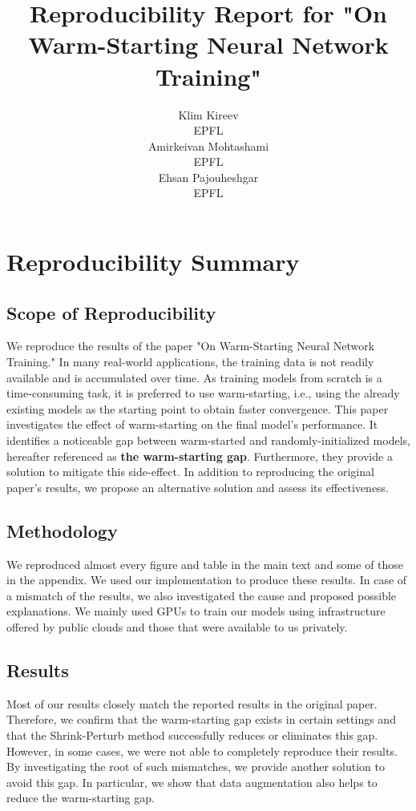 \documentclass{article}
\title{Reproducibility Report for "On Warm-Starting Neural Network Training"}
\author{%
  Klim Kireev\\
  EPFL \\
  \And
  Amirkeivan Mohtashami\\
  EPFL \\
  \And
  Ehsan Pajouheshgar \\
  EPFL \\
%
%
%
%
%
%
%
%
%
%
%
%
%
%
%
%
%
%
%
%
%
%
}
\begin{document}
\maketitle

\section*{\centering Reproducibility Summary}

\subsection*{Scope of Reproducibility}
 

We reproduce the results of the paper "On Warm-Starting Neural Network Training." In many real-world applications, the training data is not readily available and is accumulated over time. As training models from scratch is a time-consuming task, it is preferred to use warm-starting, i.e., using the already existing models as the starting point to obtain faster convergence. This paper investigates the effect of warm-starting on the final model's performance. It identifies a noticeable gap between warm-started and randomly-initialized models, hereafter referenced as \textbf{the warm-starting gap}. Furthermore, they provide a solution to mitigate this side-effect. In addition to reproducing the original paper's results, we propose an alternative solution and assess its effectiveness.

\subsection*{Methodology}
We reproduced almost every figure and table in the main text and some of those in the appendix. We used our implementation to produce these results. In case of a mismatch of the results, we also investigated the cause and proposed possible explanations. We mainly used GPUs to train our models using infrastructure offered by public clouds and those that were available to us privately. 

\subsection*{Results}

Most of our results closely match the reported results in the original paper. Therefore, we confirm that the warm-starting gap exists in certain settings and that the Shrink-Perturb method successfully reduces or eliminates this gap. However, in some cases, we were not able to completely reproduce their results. By investigating the root of such mismatches, we provide another solution to avoid this gap. In particular, we show that data augmentation also helps to reduce the warm-starting gap.
\end{document}
